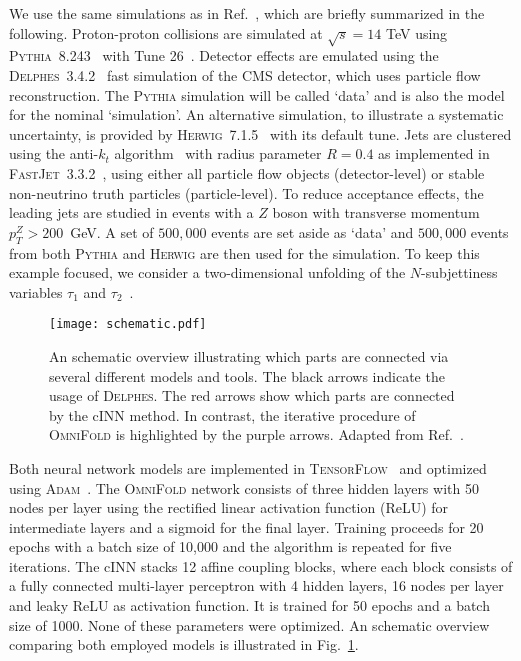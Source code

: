 \documentclass[a4paper,11pt]{article}
\begin{document}
We use the same simulations as in Ref.~\cite{Andreassen:2019cjw}, which are briefly summarized in the following.   Proton-proton collisions are simulated at $\sqrt{s}=14$ TeV using \textsc{Pythia}~8.243~\cite{Sjostrand:2007gs,Sjostrand:2006za,Sjostrand:2014zea} with Tune 26~\cite{ATL-PHYS-PUB-2014-021}.  Detector effects are emulated using the \textsc{Delphes}~3.4.2~\cite{deFavereau:2013fsa} fast simulation of the CMS detector, which uses particle flow reconstruction.  The \textsc{Pythia} simulation will be called `data' and is also the model for the nominal `simulation'.  An alternative simulation, to illustrate a systematic uncertainty, is provided by \textsc{Herwig}~7.1.5~\cite{Bahr:2008pv,Bellm:2015jjp,Bellm:2017bvx} with its default tune.  Jets are clustered using the anti-$k_t$ algorithm~\cite{Cacciari:2008gp} with radius parameter $R=0.4$ as implemented in \textsc{FastJet}~3.3.2~\cite{Cacciari:2011ma,Cacciari:2005hq}, using either  all particle flow objects (detector-level) or stable non-neutrino truth particles (particle-level).  To reduce acceptance effects, the leading jets are studied in events with a $Z$ boson with transverse momentum $p_T^Z>200$~GeV.  A set of $500,000$ events are set aside as `data' and $500,000$ events from both \textsc{Pythia} and \textsc{Herwig} are then used for the simulation.  To keep this example focused, we consider a two-dimensional unfolding of the $N$-subjettiness variables $\tau_1$ and $\tau_2$~\cite{Thaler:2010tr,Thaler:2011gf}.

\begin{figure}[h!]
    \centering
    \texttt{[image: schematic.pdf]}
    \caption{An schematic overview illustrating which parts are connected via several different models and tools.
    The black arrows indicate the usage of \textsc{Delphes}. The red arrows show which parts are connected by the cINN method. In contrast, the iterative procedure of \textsc{OmniFold} is highlighted by the purple arrows.  Adapted from Ref.~\cite{Andreassen:2019cjw}.}
    \label{fig:overview}
\end{figure}

Both neural network models are implemented in \textsc{TensorFlow}~\cite{tensorflow} and optimized using \textsc{Adam}~\cite{adam}.  The \textsc{OmniFold} network consists of three hidden layers with 50 nodes per layer using the rectified linear activation function (ReLU) for intermediate layers and a sigmoid for the final layer.   Training proceeds for 20 epochs with a batch size of 10,000 and the algorithm is repeated for five iterations. The cINN stacks 12 affine coupling blocks, where each block consists of a fully connected multi-layer perceptron with 4 hidden layers, 16 nodes per layer and leaky ReLU as activation function. It is trained for 50 epochs and a batch size of 1000.  None of these parameters were optimized. An schematic overview comparing both employed models is illustrated in Fig.~\ref{fig:overview}.
\end{document}
